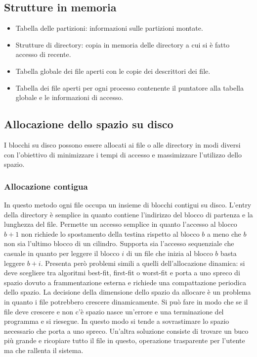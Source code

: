 \subsection{Strutture in memoria}
\begin{itemize}
	\item Tabella delle partizioni: informazioni sulle partizioni montate.
	\item Strutture di directory: copia in memoria delle directory a cui si \`e fatto accesso di recente.
	\item Tabella globale dei file aperti con le copie dei descrittori dei file.
	\item Tabella dei file aperti per ogni processo contenente il puntatore alla tabella globale e le informazioni di accesso. 
\end{itemize}
\subsection{Allocazione dello spazio su disco}
I blocchi su disco possono essere allocati ai file o alle directory in modi diversi con l'obiettivo di minimizzare i tempi di accesso e massimizzare l'utilizzo dello spazio. 
\subsubsection{Allocazione contigua}
In questo metodo ogni file occupa un insieme di blocchi contigui su disco. L'entry della directory \`e semplice in quanto contiene l'indirizzo del blocco di partenza e la lunghezza del
file. Permette un accesso semplice in quanto l'accesso al blocco $b+1$ non richiede lo spostamento della testina rispetto al blocco $b$ a meno che $b$ non sia l'ultimo blocco di un 
cilindro. Supporta sia l'accesso sequenziale che casuale in quanto per leggere il blocco $i$ di un file che inizia al blocco $b$ basta leggere $b+i$. Presenta per\`o problemi 
simili a quelli dell'allocazione dinamica: si deve scegliere tra algoritmi best-fit, first-fit o worst-fit e porta a uno spreco di spazio dovuto a frammentazione esterna e richiede
una compattazione periodica dello spazio. La decisione della dimensione dello spazio da allocare \`e un problema in quanto i file potrebbero crescere dinamicamente. Si pu\`o fare in
modo che se il file deve crescere e non c'\`e spazio nasce un'errore e una terminazione del programma e si riesegue. In questo modo si tende a sovrastimare lo spazio necessario che
porta a uno spreco. Un'altra soluzione consiste di trovare un buco pi\`u grande e ricopiare tutto il file in questo, operazione trasparente per l'utente ma che rallenta il sistema. 
